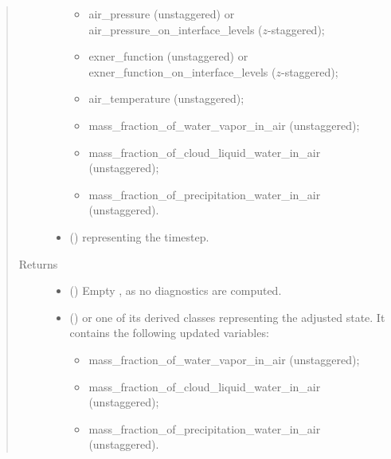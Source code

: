 \documentclass[letterpaper,10pt,english]{sphinxmanual}
\begin{document}
\begin{fulllineitems}
\begin{fulllineitems}
\begin{quote}
\begin{description}
\begin{itemize}
\begin{itemize}
\item {} 
air\_pressure (unstaggered) or air\_pressure\_on\_interface\_levels (\(z\)-staggered);

\item {} 
exner\_function (unstaggered) or exner\_function\_on\_interface\_levels (\(z\)-staggered);

\item {} 
air\_temperature (unstaggered);

\item {} 
mass\_fraction\_of\_water\_vapor\_in\_air (unstaggered);

\item {} 
mass\_fraction\_of\_cloud\_liquid\_water\_in\_air (unstaggered);

\item {} 
mass\_fraction\_of\_precipitation\_water\_in\_air (unstaggered).

\end{itemize}


\item {} 
 () \textendash{}  representing the timestep.

\end{itemize}

\item[{Returns}] \leavevmode
\begin{itemize}
\item {} 
 () \textendash{} Empty {\hyperref[\detokenize{api:tasmania.storages.grid_data.GridData}]{}}, as no diagnostics are computed.

\item {} 
 () \textendash{} {\hyperref[\detokenize{api:tasmania.storages.grid_data.GridData}]{}} or one of its derived classes representing the adjusted state.
It contains the following updated variables:
\begin{itemize}
\item {} 
mass\_fraction\_of\_water\_vapor\_in\_air (unstaggered);

\item {} 
mass\_fraction\_of\_cloud\_liquid\_water\_in\_air (unstaggered);

\item {} 
mass\_fraction\_of\_precipitation\_water\_in\_air (unstaggered).


\end{itemize}
\end{itemize}
\end{description}
\end{quote}
\end{fulllineitems}
\end{fulllineitems}
\end{document}
